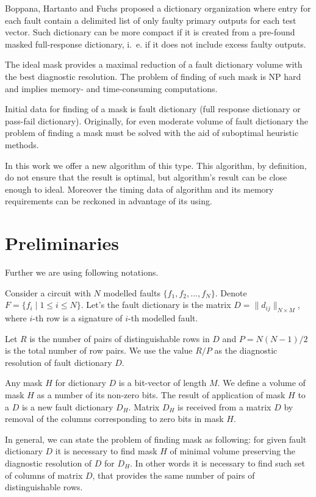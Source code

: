 \documentclass{article}
\begin{document}
Boppana, Hartanto and Fuchs \cite{Boppana-HF} proposed a
dictionary organization where entry for each fault contain a
delimited list of only faulty primary outputs for each test
vector. Such dictionary can be more compact if it is created from
a pre-found masked full-response dictionary, i.~e. if it does not
include excess faulty outputs.

The ideal mask provides a maximal reduction of a fault dictionary
volume with the best diagnostic resolution. The problem of finding
of such mask is NP hard and implies memory- and time-consuming
computations.

Initial data for finding of a mask is fault dictionary (full
response dictionary or pass-fail dictionary). Originally, for even
moderate volume of  fault dictionary the problem of finding a mask
must be solved with the aid of suboptimal heuristic methods.

In this work we offer a new algorithm of this type. This
algorithm, by definition, do not ensure that the result is
optimal, but algorithm's result can be close enough to ideal.
Moreover the timing data of algorithm and its memory requirements
can be reckoned in advantage of its using.


\section{Preliminaries}
Further we are using following notations.

Consider a  circuit with $N$ modelled faults
$\{f_1,f_2,\dots,f_N\}$. Denote $F=\{f_i\mid 1 \leqslant
i\leqslant N\}$. Let's the fault dictionary is  the matrix
$D=\|d_{ij}\|_{N\times M}$, where $i$-th row is a signature of
$i$-th modelled fault.

Let $R$ is the number of pairs of distinguishable rows in $D$ and
$P=N(N-1)/2$ is  the total number of row pairs.  We use the value
$R/P$ as the diagnostic resolution of fault dictionary $D$.

Any mask $H$ for dictionary $D$ is a bit-vector of length $M$. We
define a volume of mask $H$ as a number of its non-zero bits. The
result of application of mask $H$ to a $D$ is a new fault
dictionary $D_{H}$. Matrix $D_H$ is received from a matrix $D$ by
removal of the columns corresponding to zero bits in mask $H$.

In general, we can state the problem of finding mask as following:
for given fault dictionary $D$ it is necessary to find mask $H$ of
minimal volume preserving the diagnostic resolution of $D$ for
$D_H$. In other words  it is necessary to find such set of columns
of matrix $D$, that provides the same number of pairs of
distinguishable rows.
\end{document}
